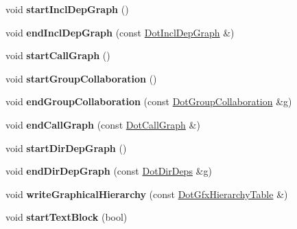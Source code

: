 \begin{DoxyCompactItemize}
void {\bfseries start\+Incl\+Dep\+Graph} ()
\item 
\mbox{\label{class_latex_generator_adf3644a1a735b0f1109400e8733c2b9d}} 
void {\bfseries end\+Incl\+Dep\+Graph} (const \mbox{\hyperlink{class_dot_incl_dep_graph}{Dot\+Incl\+Dep\+Graph}} \&)
\item 
\mbox{\label{class_latex_generator_a0efcfff69a3e26f29f186b9d626128c3}} 
void {\bfseries start\+Call\+Graph} ()
\item 
\mbox{\label{class_latex_generator_afda9dc899675e9f29af32a30812a5c8b}} 
void {\bfseries start\+Group\+Collaboration} ()
\item 
\mbox{\label{class_latex_generator_a4f5a9cd27f543d3e22e0c1cb3decc429}} 
void {\bfseries end\+Group\+Collaboration} (const \mbox{\hyperlink{class_dot_group_collaboration}{Dot\+Group\+Collaboration}} \&g)
\item 
\mbox{\label{class_latex_generator_a04796ce1fdfb4dedbbe17b1fdffca000}} 
void {\bfseries end\+Call\+Graph} (const \mbox{\hyperlink{class_dot_call_graph}{Dot\+Call\+Graph}} \&)
\item 
\mbox{\label{class_latex_generator_abc79ee7e0a83ce1b804189f74d55d899}} 
void {\bfseries start\+Dir\+Dep\+Graph} ()
\item 
\mbox{\label{class_latex_generator_abe85ace3e82260352e73fc91fc787423}} 
void {\bfseries end\+Dir\+Dep\+Graph} (const \mbox{\hyperlink{class_dot_dir_deps}{Dot\+Dir\+Deps}} \&g)
\item 
\mbox{\label{class_latex_generator_a837cdd6757718e6c2aac97fade95d2b7}} 
void {\bfseries write\+Graphical\+Hierarchy} (const \mbox{\hyperlink{class_dot_gfx_hierarchy_table}{Dot\+Gfx\+Hierarchy\+Table}} \&)
\item 
\mbox{\label{class_latex_generator_aecbc8d579dde1ce7f186d1ffe31340e4}} 
void {\bfseries start\+Text\+Block} (bool)
\item 
\mbox{\label{class_latex_generator_a57dadc601e009ee68a09494b3d400caa}} 

\end{DoxyCompactItemize}
